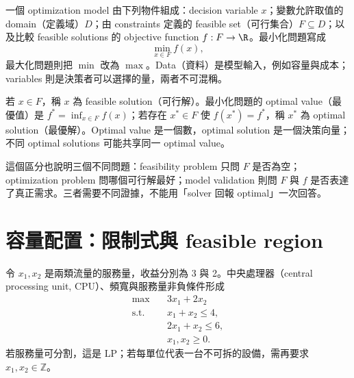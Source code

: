 \documentclass[11pt,a4paper,oneside,openany]{book}
\begin{document}
\begin{definition}
一個 optimization model 由下列物件組成：decision variable $x$；變數允許取值的 domain（定義域）$D$；由 constraints 定義的 feasible set（可行集合）$F\subseteq D$；以及比較 feasible solutions 的 objective function $f:F\to\R$。最小化問題寫成
\[
 \min_{x\in F}f(x),
\]
最大化問題則把 $\min$ 改為 $\max$。Data（資料）是模型輸入，例如容量與成本；variables 則是決策者可以選擇的量，兩者不可混稱。
\end{definition}

\begin{definition}
若 $x\in F$，稱 $x$ 為 feasible solution（可行解）。最小化問題的 optimal value（最優值）是 $f^*=\inf_{x\in F}f(x)$；若存在 $x^*\in F$ 使 $f(x^*)=f^*$，稱 $x^*$ 為 optimal solution（最優解）。Optimal value 是一個數，optimal solution 是一個決策向量；不同 optimal solutions 可能共享同一 optimal value。
\end{definition}

這個區分也說明三個不同問題：feasibility problem 只問 $F$ 是否為空；optimization problem 問哪個可行解最好；model validation 則問 $F$ 與 $f$ 是否表達了真正需求。三者需要不同證據，不能用「solver 回報 optimal」一次回答。

\section{容量配置：限制式與 feasible region}
令 $x_1,x_2$ 是兩類流量的服務量，收益分別為 3 與 2。中央處理器（central processing unit, CPU）、頻寬與服務量非負條件形成
\begin{align}
\max\quad &3x_1+2x_2 \label{eq:lp-objective}\\
\text{s.t.}\quad &x_1+x_2\le4,\nonumber\\
&2x_1+x_2\le6,\nonumber\\
&x_1,x_2\ge0.\nonumber
\end{align}
若服務量可分割，這是 LP；若每單位代表一台不可拆的設備，需再要求 $x_1,x_2\in\mathbb{Z}$。
\end{document}
